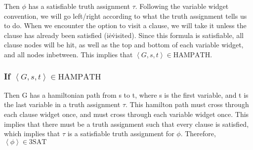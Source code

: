 Then $\phi$ has a satisfiable truth assignment $\tau$. Following the variable widget convention, we will go left/right according to what the truth assignment tells us to do. When we encounter the option to visit a clause, we will take it unless the clause has already been satisfied (i\.e\. visited). Since this formula is satisfiable, all clause nodes will be hit, as well as the top and bottom of each variable widget, and all nodes inbetween. This implies that $\left<G,s,t\right>\in\text{HAMPATH}$.

\subsubsection{If $\left<G,s,t\right>\in\text{HAMPATH}$}

Then G has a hamiltonian path from s to t, where s is the first variable, and t is the last variable in a truth assignment $\tau$. This hamilton path must cross through each clause widget once, and must cross through each variable widget once. This implies that there must be a truth assignment such that every clause is satisfied, which implies that $\tau$ is a satisfiable truth assignment for $\phi$. Therefore, $\left<\phi\right>\in\text{3SAT}$

